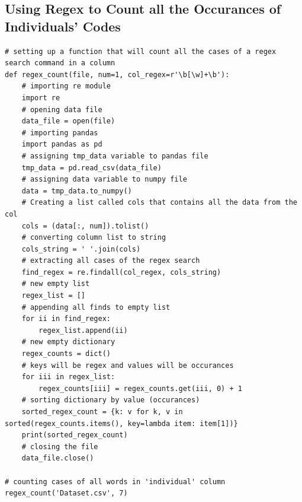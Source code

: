 \documentclass[letterpaper]{article}
\begin{document}
\subsection{Using Regex to Count all the Occurances of Individuals' Codes}
\begin{verbatim}
# setting up a function that will count all the cases of a regex search command in a column
def regex_count(file, num=1, col_regex=r'\b[\w]+\b'):
    # importing re module
    import re
    # opening data file
    data_file = open(file)
    # importing pandas
    import pandas as pd
    # assigning tmp_data variable to pandas file
    tmp_data = pd.read_csv(data_file)
    # assigning data variable to numpy file
    data = tmp_data.to_numpy()
    # Creating a list called cols that contains all the data from the col
    cols = (data[:, num]).tolist()
    # converting column list to string
    cols_string = ' '.join(cols)
    # extracting all cases of the regex search
    find_regex = re.findall(col_regex, cols_string)
    # new empty list
    regex_list = []
    # appending all finds to empty list
    for ii in find_regex:
        regex_list.append(ii)
    # new empty dictionary
    regex_counts = dict()
    # keys will be regex and values will be occurances
    for iii in regex_list:
        regex_counts[iii] = regex_counts.get(iii, 0) + 1
    # sorting dictionary by value (occurances)
    sorted_regex_count = {k: v for k, v in sorted(regex_counts.items(), key=lambda item: item[1])}
    print(sorted_regex_count)
    # closing the file
    data_file.close()

# counting cases of all words in 'individual' column
regex_count('Dataset.csv', 7)
\end{verbatim}
\end{document}

